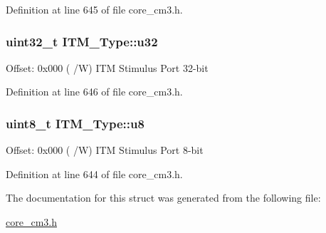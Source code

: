 Definition at line 645 of file core\+\_\+cm3.\+h.

\subsubsection[{\texorpdfstring{u32}{u32}}]{ uint32\+\_\+t I\+T\+M\+\_\+\+Type\+::u32}\hypertarget{structITM__Type_a6882fa5af67ef5c5dfb433b3b68939df}{}\label{structITM__Type_a6882fa5af67ef5c5dfb433b3b68939df}
Offset\+: 0x000 ( /W) I\+TM Stimulus Port 32-\/bit 

Definition at line 646 of file core\+\_\+cm3.\+h.

\subsubsection[{\texorpdfstring{u8}{u8}}]{ uint8\+\_\+t I\+T\+M\+\_\+\+Type\+::u8}\hypertarget{structITM__Type_abea77b06775d325e5f6f46203f582433}{}\label{structITM__Type_abea77b06775d325e5f6f46203f582433}
Offset\+: 0x000 ( /W) I\+TM Stimulus Port 8-\/bit 

Definition at line 644 of file core\+\_\+cm3.\+h.



The documentation for this struct was generated from the following file\+:\begin{DoxyCompactItemize}
\item 
\hyperlink{core__cm3_8h}{core\+\_\+cm3.\+h}\end{DoxyCompactItemize}
